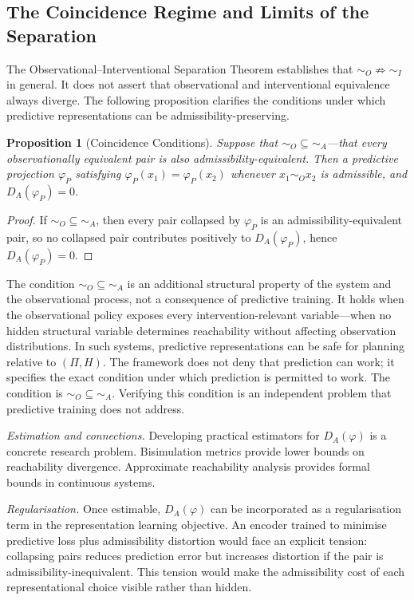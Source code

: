 \documentclass[11pt, a4paper]{article}
\theoremstyle{plain}
\newtheorem{proposition}{Proposition}
\theoremstyle{definition}
\theoremstyle{remark}
\newcommand{\simA}{\sim_A}
\newcommand{\simO}{\sim_O}
\newcommand{\simI}{\sim_I}
\newcommand{\DA}{D_A(\varphi)}
\begin{document}
\subsection{The Coincidence Regime and Limits of the Separation}

The Observational--Interventional Separation Theorem establishes that
$\simO \not\Rightarrow \simI$ in general. It does not assert that observational
and interventional equivalence always diverge. The following proposition clarifies
the conditions under which predictive representations can be admissibility-preserving.

\begin{proposition}[Coincidence Conditions]
\label{prop:coincidence}
Suppose that ${\simO} \subseteq {\simA}$---that every observationally equivalent
pair is also admissibility-equivalent. Then a predictive projection $\varphi_P$
satisfying $\varphi_P(x_1) = \varphi_P(x_2)$ whenever $x_1 \simO x_2$ is
admissible, and $D_A(\varphi_P) = 0$.
\end{proposition}

\begin{proof}
If ${\simO} \subseteq {\simA}$, then every pair collapsed by $\varphi_P$ is an
admissibility-equivalent pair, so no collapsed pair contributes positively to
$D_A(\varphi_P)$, hence $D_A(\varphi_P) = 0$.
\end{proof}

The condition ${\simO} \subseteq {\simA}$ is an additional structural property
of the system and the observational process, not a consequence of predictive
training. It holds when the observational policy exposes every intervention-relevant
variable---when no hidden structural variable determines reachability without
affecting observation distributions. In such systems, predictive representations
can be safe for planning relative to $(\Pi, H)$. The framework does not deny
that prediction can work; it specifies the exact condition under which prediction
is permitted to work. The condition is ${\simO} \subseteq {\simA}$. Verifying
this condition is an independent problem that predictive training does not address.

\emph{Estimation and connections.} Developing practical estimators for $\DA$ is
a concrete research problem. Bisimulation metrics \citep{ferns2004metrics} provide
lower bounds on reachability divergence. Approximate reachability analysis
\citep{tomlin2003computational} provides formal bounds in continuous systems.

\emph{Regularisation.} Once estimable, $\DA$ can be incorporated as a
regularisation term in the representation learning objective. An encoder trained
to minimise predictive loss plus admissibility distortion would face an explicit
tension: collapsing pairs reduces prediction error but increases distortion if
the pair is admissibility-inequivalent. This tension would make the
admissibility cost of each representational choice visible rather than hidden.
\end{document}
